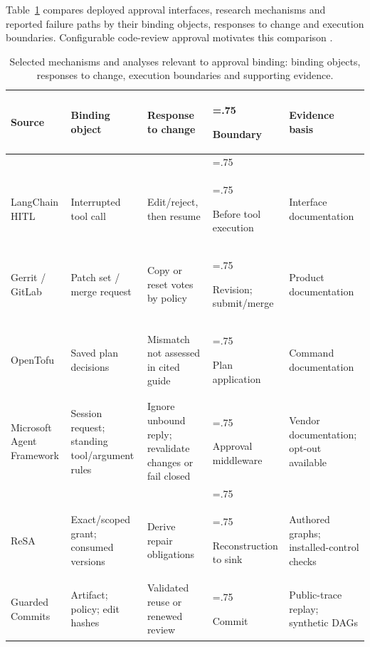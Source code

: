 \documentclass[pdflatex,sn-basic]{sn-jnl}
\begin{document}
Table~\ref{tab:related} compares deployed approval interfaces, research mechanisms and reported failure paths by their binding objects, responses to change and execution boundaries. Configurable code-review approval motivates this comparison \citep{gerrit-copy-condition,gitlab-approvals}.

\begin{table}[ht]
\caption{Selected mechanisms and analyses relevant to approval binding: binding objects, responses to change, execution boundaries and supporting evidence.}\label{tab:related}
\centering\fontsize{7.6}{9.2}\selectfont
\setlength{\tabcolsep}{2.6pt}
\renewcommand{\arraystretch}{1.05}
\begin{tabularx}{\textwidth}{@{}>{\hsize=1.05\hsize\raggedright\arraybackslash}X>{\hsize=1.0\hsize\raggedright\arraybackslash}X>{\hsize=1.05\hsize\raggedright\arraybackslash}X>{\hsize=.75\hsize\raggedright\arraybackslash}X>{\hsize=1.15\hsize\raggedright\arraybackslash}X@{}}
\toprule
Source & Binding object & Response to change & Boundary & Evidence basis \\
\midrule
\multicolumn{5}{@{}l}{\textit{Deployed approval interfaces}}\\
\addlinespace[1pt]
LangChain HITL \citep{langchain-hitl} & Interrupted tool call & Edit/reject, then resume & Before tool execution & Interface documentation \\
Gerrit / GitLab \citep{gerrit-copy-condition,gerrit-submit-requirements,gitlab-approvals} & Patch set / merge request & Copy or reset votes by policy & Revision; submit/merge & Product documentation \\
OpenTofu \citep{opentofu-plan-apply} & Saved plan decisions & Mismatch not assessed in cited guide & Plan application & Command documentation \\
Microsoft Agent Framework \citep{msaf-tool-approval} & Session request; standing tool/argument rules & Ignore unbound reply; revalidate changes or fail closed & Approval middleware & Vendor documentation; opt-out available \\
\midrule
\multicolumn{5}{@{}l}{\textit{Research mechanisms and analyses}}\\
\addlinespace[1pt]
ReSA \citep{zhu2026resa} & Exact/scoped grant; consumed versions & Derive repair obligations & Reconstruction to sink & Authored graphs; installed-control checks \\
Guarded Commits \citep{bindschaedler2026guarded} & Artifact; policy; edit hashes & Validated reuse or renewed review & Commit & Public-trace replay; synthetic DAGs \\

\end{tabularx}
\end{table}
\end{document}
